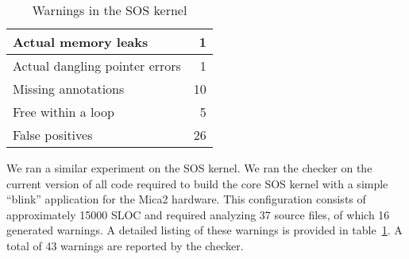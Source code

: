 \begin{table}
\caption{Warnings in the SOS kernel}
%
\label{tab:kernel}
\centering 
\begin{tabular}{| l | r |}
    \hline 
    Actual memory leaks & 1 \\
    \hline 
    Actual dangling pointer errors & 1 \\
    \hline
    Missing annotations & 10 \\
    \hline 
    Free within a loop & 5 \\
    \hline 
    False positives & 26 \\
    \hline 
\end{tabular} 
%
\end{table}

We ran a similar experiment on the SOS kernel.  We ran the checker on
the current version of all code required to build the core SOS kernel
with a simple ``blink'' application for the Mica2 hardware.  This
configuration consists of approximately 15000 SLOC and required
analyzing 37 source files, of which 16 generated warnings.  A detailed
listing of these warnings is provided in table~\ref{tab:kernel}.
%
A total of 43 warnings are reported by the checker.

